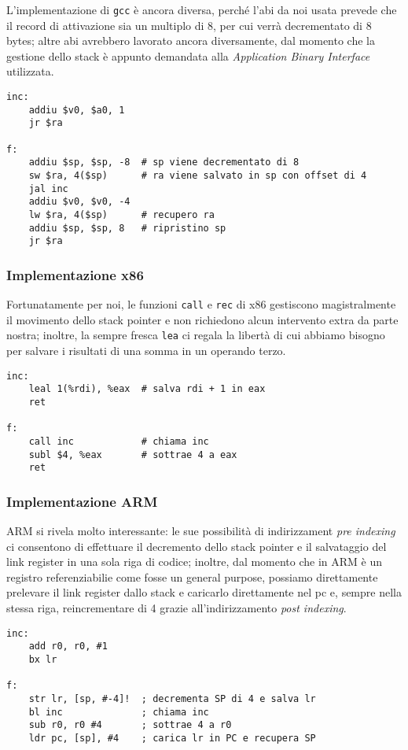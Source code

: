 \documentclass[class=book, crop=false, oneside]{standalone}
\begin{document}
L'implementazione di \texttt{gcc} è ancora diversa, perché l'\acrshort{abi} da noi usata prevede che il record di attivazione sia un multiplo di 8, per cui  verrà decrementato di 8 bytes; altre \acrshort{abi} avrebbero lavorato ancora diversamente, dal momento che la gestione dello stack è appunto demandata alla \emph{Application Binary Interface} utilizzata.
\begin{verbatim}
inc:
	addiu $v0, $a0, 1
	jr $ra

f:
	addiu $sp, $sp, -8  # sp viene decrementato di 8
	sw $ra, 4($sp)      # ra viene salvato in sp con offset di 4
	jal inc
	addiu $v0, $v0, -4
	lw $ra, 4($sp)      # recupero ra
	addiu $sp, $sp, 8   # ripristino sp
	jr $ra
\end{verbatim}

\subsubsection{Implementazione x86}
Fortunatamente per noi, le funzioni \texttt{call} e \texttt{rec} di x86 gestiscono magistralmente il movimento dello stack pointer e non richiedono alcun intervento extra da parte nostra; inoltre, la sempre fresca \texttt{lea} ci regala la libertà di cui abbiamo bisogno per salvare i risultati di una somma in un operando terzo.
\begin{verbatim}
inc:
	leal 1(%rdi), %eax  # salva rdi + 1 in eax
	ret

f:
	call inc            # chiama inc
	subl $4, %eax       # sottrae 4 a eax
	ret
\end{verbatim}

\subsubsection{Implementazione ARM}
ARM si rivela molto interessante: le sue possibilità di indirizzament \emph{pre indexing} ci consentono di effettuare il decremento dello stack pointer e il salvataggio del link register in una sola riga di codice; inoltre, dal momento che in ARM  è un registro referenziabilie come fosse un general purpose, possiamo direttamente prelevare il link register dallo stack e caricarlo direttamente nel \acrfull{pc} e, sempre nella stessa riga, reincrementare  di 4 grazie all'indirizzamento \emph{post indexing}.
\begin{verbatim}
inc:
	add r0, r0, #1
	bx lr

f:
	str lr, [sp, #-4]!  ; decrementa SP di 4 e salva lr
	bl inc              ; chiama inc
	sub r0, r0 #4       ; sottrae 4 a r0
	ldr pc, [sp], #4    ; carica lr in PC e recupera SP
\end{verbatim}
\end{document}
